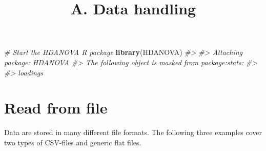 \documentclass[
]{article}
\title{A. Data handling}
\author{}
\date{\vspace{-2.5em}}
\newenvironment{Shaded}{\begin{snugshade}}{\end{snugshade}}
\newcommand{\CommentTok}[1]{\textcolor[rgb]{0.56,0.35,0.01}{\textit{#1}}}
\newcommand{\FunctionTok}[1]{\textcolor[rgb]{0.13,0.29,0.53}{\textbf{#1}}}
\newcommand{\NormalTok}[1]{#1}
\begin{document}
\maketitle

\begin{Shaded}
\begin{Highlighting}[]
\CommentTok{\# Start the HDANOVA R package}
\FunctionTok{library}\NormalTok{(HDANOVA)}
\CommentTok{\#\textgreater{} }
\CommentTok{\#\textgreater{} Attaching package: \textquotesingle{}HDANOVA\textquotesingle{}}
\CommentTok{\#\textgreater{} The following object is masked from \textquotesingle{}package:stats\textquotesingle{}:}
\CommentTok{\#\textgreater{} }
\CommentTok{\#\textgreater{}     loadings}
\end{Highlighting}
\end{Shaded}

\section{Read from file}\label{read-from-file}

Data are stored in many different file formats. The following three
examples cover two types of CSV-files and generic flat files.
\end{document}
